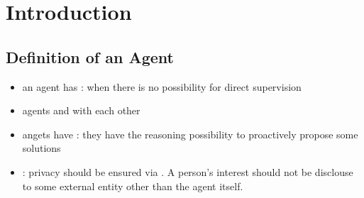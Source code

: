 \chapter{Introduction}
\minitoc

\section{Definition of an Agent}
\begin{itemize}
\item an agent has : when there is no possibility for direct supervision
\item agents  and  with each other
\item angets have : they have the reasoning possibility to proactively propose some solutions
\item {}: privacy should be ensured via . A person's interest should not be disclouse to some external entity other than the agent itself.
\end{itemize}


